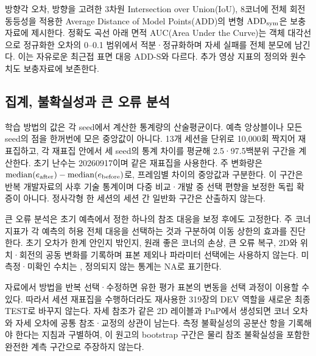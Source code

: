 방향각 오차, 방향을 고려한 3차원 Intersection over Union(IoU), 8코너에 전체 회전 동등성을 적용한 Average Distance of Model Points(ADD)의 변형 $\mathrm{ADD}_{\rm sym}$은 보충자료에 제시한다. 정확도 곡선 아래 면적 AUC(Area Under the Curve)는 객체 대각선으로 정규화한 오차의 0--0.1 범위에서 적분·정규화하며 자세 실패를 전체 분모에 남긴다. 이는 자유로운 최근접 표면 대응 ADD-S와 다르다. 추가 영상 지표의 정의와 원수치도 보충자료에 보존한다.

\subsection{집계, 불확실성과 큰 오류 분석}
학습 방법의 값은 각 seed에서 계산한 통계량의 산술평균이다. 예측 앙상블이나 모든 seed의 점을 한꺼번에 모은 중앙값이 아니다. 13개 세션을 단위로 10,000회 짝지어 재표집하고, 각 재표집 안에서 세 seed의 통계 차이를 평균해 2.5·97.5백분위 구간을 계산한다. 초기 난수는 20260917이며 같은 재표집을 사용한다. 주 변화량은 $\operatorname{median}(e_{\rm after})-\operatorname{median}(e_{\rm before})$로, 프레임별 차이의 중앙값과 구분한다. 이 구간은 반복 개발자료의 사후 기술 통계이며 다중 비교·개발 중 선택 편향을 보정한 독립 확증이 아니다. 정사각형 한 세션의 세션 간 일반화 구간은 산출하지 않는다.

큰 오류 분석은 초기 예측에서 정한 하나의 참조 대응을 보정 후에도 고정한다. 주 코너 지표가 각 예측의 허용 전체 대응을 선택하는 것과 구분하여 이동 상한의 효과를 진단한다. 초기 오차가 한계 안인지 밖인지, 원래 좋은 코너의 손상, 큰 오류 복구, 2D와 위치·회전의 공동 변화를 기록하며 표본 제외나 파라미터 선택에는 사용하지 않는다. 미측정·미확인 수치는 \notrun, 정의되지 않는 통계는 NA로 표기한다.

자료에서 방법을 반복 선택·수정하면 유한 평가 표본의 변동을 선택 과정이 이용할 수 있다\cite{cawley2010}. 따라서 세션 재표집을 수행하더라도 재사용한 319장의 DEV 역할을 새로운 최종 TEST로 바꾸지 않는다. 자세 참조가 같은 2D 레이블과 PnP에서 생성되면 코너 오차와 자세 오차에 공통 참조·교정의 상관이 남는다. 측정 불확실성의 공분산 항을 기록해야 한다는 지침\cite{gum2008}과 구별하여, 이 원고의 bootstrap 구간은 물리 참조 불확실성을 포함한 완전한 계측 구간으로 주장하지 않는다.
